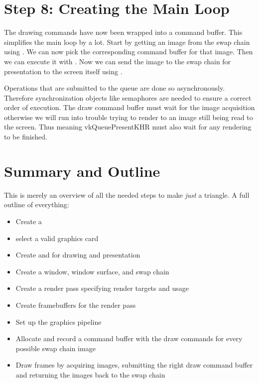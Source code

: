 \section*{Step 8: Creating the Main Loop}
\par The drawing commands have now been wrapped into a command buffer. This simplifies the main loop by a lot. Start by getting an image from the swap chain using . We can now pick the corresponding command buffer for that image. Then we can execute it with . Now we can send the image to the swap chain for presentation to the screen itself using .

\par Operations that are submitted to the queue are done so asynchronously. Therefore synchronization objects like semaphores are needed to ensure a correct order of execution. The draw command buffer must wait for the image acquisition otherwise we will run into trouble trying to render to an image still being read to the screen. Thus meaning vkQueuePresentKHR must also wait for any rendering to be finished.

\section*{Summary and Outline}
\par This is merely an overview of all the needed steps to make \emph{just} a triangle. A full outline of everything:
\begin{itemize}
    \item Create a 
    \item select a valid graphics card 
    \item Create  and  for drawing and presentation
    \item Create a window, window surface, and swap chain
    \item Create a render pass specifying render targets and usage
    \item Create framebuffers for the render pass
    \item Set up the graphics pipeline
    \item Allocate and record a command buffer with the draw commands for every possible swap chain image
    \item Draw frames by acquiring images, submitting the right draw command buffer and returning the images back to the swap chain
\end{itemize}

